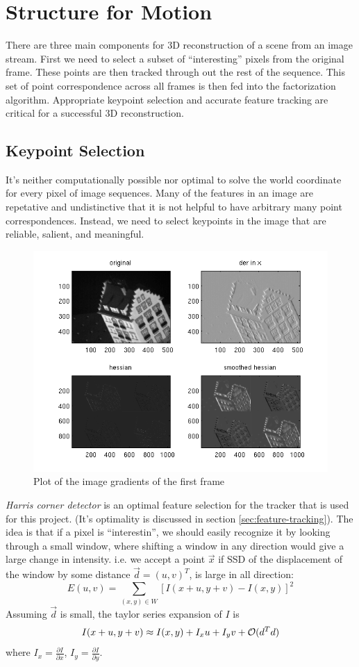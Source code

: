 \section{Structure for Motion}
\label{sec:main}
There are three main components for 3D reconstruction of a scene from
an image stream. First we need to select a subset of
``interesting'' pixels from the original frame. These points are then
tracked through out the rest of the sequence. This set of point
correspondence across all frames is then fed into the factorization algorithm. Appropriate keypoint selection and accurate feature tracking
are critical for a successful 3D reconstruction. 

\subsection{Keypoint Selection}
\label{sec:keypoint-selection}
It's neither computationally possible nor optimal to solve the world coordinate
for every pixel of image sequences. Many of the features in an image are
repetative and undistinctive that it is not helpful to have arbitrary
many point correspondences. Instead, we need to select keypoints in
the image that are reliable, salient, and meaningful. 
\begin{figure}[!ht]
  \begin{center}
  \includegraphics[scale=0.5]{hessian.png}
  \caption{Plot of the image gradients of the first frame} 
  \label{fig:Hessian}
  \end{center}
\end{figure}

\emph{Harris corner detector} is an optimal feature selection for the
tracker that is used for this project. (It's optimality is discussed
in section \ref{sec:feature-tracking}). The idea is that if a pixel is
``interestin'', we should easily recognize it by looking through a
small window, where shifting a window in any direction
would give a large change in intensity. i.e. we accept a point $\vec x$ if SSD of
the displacement of the window by some distance $\vec d=(u,v)^T$, is large in all
direction:$$E(u,v) =\sum_{(x,y)\in W} [I(x+u, y+v) - I(x,y)]^2$$ 
Assuming $\vec d$ is small, the taylor series expansion of $I$ is
$$I(x+u, y+v) \approx I(x,y) + I_xu +I_yv + \mathcal{O}(d^Td)$$ where $I_x
=\frac{\partial I}{\partial x} $, $I_y = \frac{\partial I}{\partial y}$.

